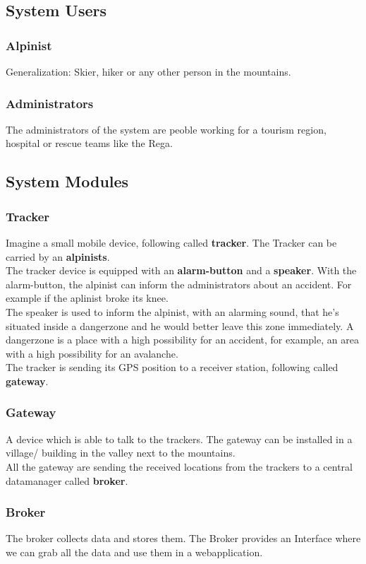 \documentclass[a4paper,11pt, oneside]{report}
\theoremstyle{definition}
\begin{document}
\subsection{System Users}
\subsubsection{Alpinist}
Generalization: Skier, hiker or any other person in the mountains.
\subsubsection{Administrators}
The administrators of the system are peoble working for a tourism region, hospital or rescue teams like the Rega.

\subsection{System Modules}
\subsubsection{Tracker}
Imagine a small mobile device, following called \textbf{tracker}. The Tracker can be carried by an \textbf{alpinists}.\\[0.3cm]
The tracker device is equipped with an \textbf{alarm-button} and a \textbf{speaker}. With the alarm-button, the alpinist can inform the administrators about an accident. For example if the aplinist broke its knee.\\[0.3cm]
The speaker is used to inform the alpinist, with an alarming sound, that he's situated inside a dangerzone and he would better leave this zone immediately. A dangerzone is a place with a high possibility for an accident, for example, an area with a high possibility for an avalanche.\\[0.3cm]
The tracker is sending its GPS position to a receiver station, following called \textbf{gateway}. 
\subsubsection{Gateway}
A device which is able to talk to the trackers. The gateway can be installed in a village/ building in the valley next to the mountains.\\[0.3cm]
All the gateway are sending the received locations from the trackers to a central datamanager called \textbf{broker}. 
\subsubsection{Broker}
The broker collects data and stores them. The Broker provides an Interface where we can grab all the data and use them in a webapplication.
\end{document}
